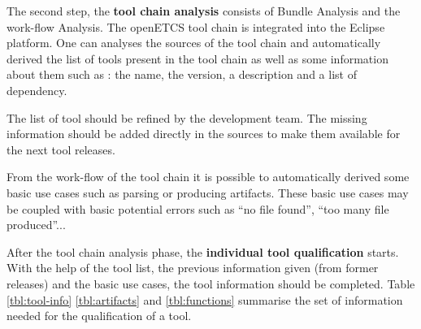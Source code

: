 


The second step, the {\bf tool chain analysis} consists of Bundle Analysis
and the work-flow Analysis.
The openETCS tool chain is integrated into the Eclipse platform. One
can analyses the sources of the tool chain and automatically derived
the list of tools present in the tool chain as well as some
information about them such as :  the name,  the version,
a description and a list of dependency.

The list of tool should be refined by the development team.
The missing information should be added directly in the
sources to make them available for the next tool releases.


From the work-flow of the tool chain it is possible to automatically
derived some basic use cases such as parsing or producing
artifacts. These basic use cases may be coupled with basic potential
errors such as ``no file found'', ``too many file produced''...

After the tool chain analysis phase, the {\bf individual tool qualification}
starts. With the help of the tool list, the previous information given
(from former releases) and the basic use cases, the tool information
should be completed. Table \ref{tbl:tool-info} \ref{tbl:artifacts} and
\ref{tbl:functions} summarise the set of information needed for the
qualification of a tool.


